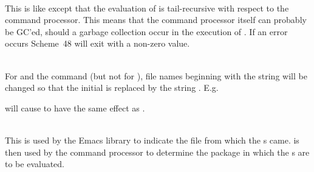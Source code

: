 \begin{description}
\item {}\\
    This is like  except that the evaluation of 
    is tail-recursive with respect to the command processor.  This
    means that the command processor itself can probably be GC'ed,
    should a garbage collection occur in the execution of .
    If an error occurs Scheme~48 will exit with a non-zero value.

\item {}\\
    For  and the  command
     (but not for ), file
    names beginning with the string  will be changed so that the
    initial  is replaced by the string .  E.g.
\begin{example}
\end{example}
    will cause  to have the same effect as
    .

\item {}\\
    This is used by the  Emacs library to indicate the file
    from which the s came.   is then used by the
    command processor to determine the package in which the s
    are to be evaluated.
\end{description}

